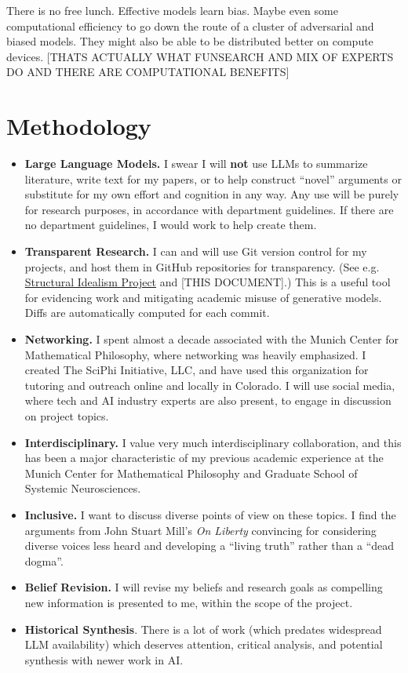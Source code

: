 \documentclass[11pt, oneside]{article}   	%
\begin{document}

There is no free lunch.  \cite{Wolpertetal1997}  Effective models learn bias.  \cite{Mitchell1980}  Maybe even some computational efficiency to go down the route of a cluster of adversarial and biased models. They might also be able to be distributed better on compute devices. [THATS ACTUALLY WHAT FUNSEARCH AND MIX OF EXPERTS DO AND THERE ARE COMPUTATIONAL BENEFITS]





\section{Methodology}

\begin{itemize}
    \item \textbf{Large Language Models.}  I swear I will \textbf{not} use LLMs to summarize literature, write text for my papers, or to help construct ``novel'' arguments or substitute for my own effort and cognition in any way. Any use will be purely for research purposes, in accordance with department guidelines.  If there are no department guidelines, I would work to help create them. 
    \item \textbf{Transparent Research.}  I can and will use Git version control for my projects, and host them in GitHub repositories for transparency.  (See e.g. \href{https://github.com/CameronBeebe/Structural_Idealism}{Structural Idealism Project} and [THIS DOCUMENT].)  This is a useful tool for evidencing work and mitigating academic misuse of generative models.  Diffs are automatically computed for each commit.
    \item \textbf{Networking.} I spent almost a decade associated with the Munich Center for Mathematical Philosophy, where networking was heavily emphasized.  I created The SciPhi Initiative, LLC, and have used this organization for tutoring and outreach online and locally in Colorado.  I will use social media, where tech and AI industry experts are also present, to engage in discussion on project topics.
    \item \textbf{Interdisciplinary.}  I value very much interdisciplinary collaboration, and this has been a major characteristic of my previous academic experience at the Munich Center for Mathematical Philosophy and Graduate School of Systemic Neurosciences.
    \item \textbf{Inclusive.}  I want to discuss diverse points of view on these topics.  I find the arguments from John Stuart Mill's \emph{On Liberty} \citep{OnLiberty1859} convincing for considering diverse voices less heard and developing a ``living truth'' rather than a ``dead dogma''.
    \item \textbf{Belief Revision.}  I will revise my beliefs and research goals as compelling new information is presented to me, within the scope of the project.
    \item \textbf{Historical Synthesis}.  There is a lot of work (which predates widespread LLM availability) which deserves attention, critical analysis, and potential synthesis with newer work in AI.
    

\end{itemize}
\end{document}
